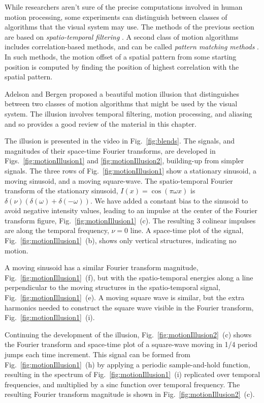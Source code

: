 While researchers aren't sure of the precise computations involved in human motion processing, some experiments  can distinguish between classes of algorithms that the visual system may use.  The methods of the previous section are based on {\em spatio-temporal filtering} \cite{Adelson85}.  A second class of motion algorithms includes correlation-based methods, and can be called {\em pattern matching methods} \cite{Adelson85}.  In such methods, the motion offset of a spatial pattern from some starting position is computed by finding the position of highest correlation with the spatial pattern.

Adelson and Bergen proposed a beautiful motion illusion that distinguishes between two classes of motion algorithms that might be used by the visual system.  The illusion involves temporal filtering, motion processing, and aliasing and so provides a good review of the material in this chapter.

The illusion is presented in the video in Fig.~\ref{fig:blends}. The signals, and magnitudes of their space-time Fourier transforms, are developed in Figs.~\ref{fig:motionIllusion1} and \ref{fig:motionIllusion2}, building-up from simpler signals.  The three rows of Fig.~\ref{fig:motionIllusion1} show a stationary sinusoid, a moving sinusoid, and a moving square-wave.  The spatio-temporal Fourier transform of the stationary sinusoid, $I(x) = \cos(\pi \omega x)$ is $\delta(\nu) (\delta(\omega) + \delta(-\omega))$.  We have added a constant bias to the sinusoid to avoid negative intensity values, leading to an impulse at the center of the Fourier transform figure, Fig.~\ref{fig:motionIllusion1}~(c).  The resulting 3 colinear impulses are along the temporal frequency, $\nu = 0$ line.  A space-time plot of the signal, Fig.~\ref{fig:motionIllusion1}~(b), shows only vertical structures, indicating no motion.

A moving sinusoid has a similar Fourier transform magnitude, Fig.~\ref{fig:motionIllusion1}~(f), but with the spatio-temporal energies along a line perpendicular to the moving structures in the spatio-temporal signal, Fig.~\ref{fig:motionIllusion1}~(e).  A moving square wave is similar, but the extra harmonics needed to construct the square wave visible in the Fourier transform, Fig.~\ref{fig:motionIllusion1}~(i).

Continuing the development of the illusion, Fig.~\ref{fig:motionIllusion2}~(c) shows the Fourier transform and space-time plot of a square-wave moving in 1/4 period jumps each time increment.  This signal can be formed from Fig.~\ref{fig:motionIllusion1}~(h) by applying a periodic sample-and-hold function, resulting in the spectrum of  Fig.~\ref{fig:motionIllusion1}~(i) replicated over temporal frequencies, and multiplied by a sinc function over temporal frequency.  The resulting Fourier transform magnitude is shown in Fig.~\ref{fig:motionIllusion2}~(c).  

